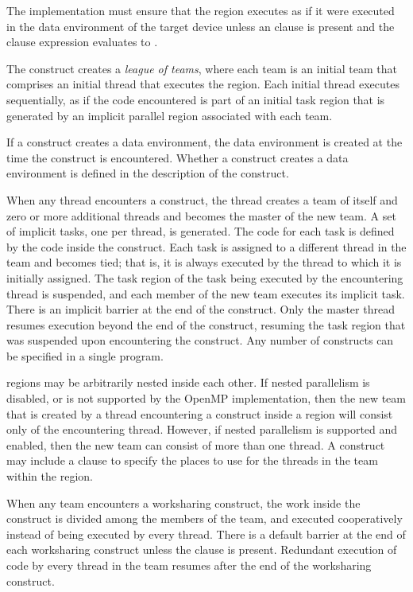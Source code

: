 The implementation must ensure that the  region executes as if it were executed in the data environment of the target device unless an  clause is present and the  clause expression evaluates to .

The  construct creates a \emph{league of teams}, where each team
is an initial team that comprises an initial thread that executes the
 region. Each initial thread executes sequentially, as if the
code encountered is part of an initial task region that is generated by an
implicit parallel region associated with each team.

If a construct creates a data environment, the data environment is created at the time the
construct is encountered. Whether a construct creates a data environment is defined in
the description of the construct.

When any thread encounters a  construct, the thread creates a team of itself
and zero or more additional threads and becomes the master of the new team. A set of
implicit tasks, one per thread, is generated. The code for each task is defined by the code
inside the  construct. Each task is assigned to a different thread in the team
and becomes tied; that is, it is always executed by the thread to which it is initially
assigned. The task region of the task being executed by the encountering thread is
suspended, and each member of the new team executes its implicit task. There is an
implicit barrier at the end of the  construct. Only the master thread resumes
execution beyond the end of the  construct, resuming the task region that
was suspended upon encountering the  construct. Any number of
 constructs can be specified in a single program.

 regions may be arbitrarily nested inside each other. If nested parallelism is
disabled, or is not supported by the OpenMP implementation, then the new team that is
created by a thread encountering a  construct inside a  region
will consist only of the encountering thread. However, if nested parallelism is supported
and enabled, then the new team can consist of more than one thread. A 
construct may include a  clause to specify the places to use for the threads
in the team within the  region.

When any team encounters a worksharing construct, the work inside the construct is
divided among the members of the team, and executed cooperatively instead of being
executed by every thread. There is a default barrier at the end of each worksharing
construct unless the  clause is present. Redundant execution of code by every
thread in the team resumes after the end of the worksharing construct.

